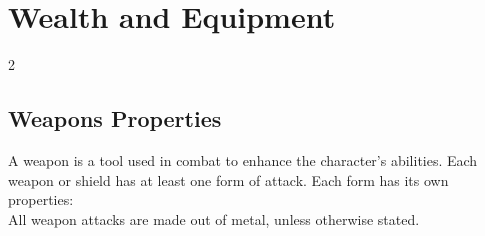\chapter{Wealth and Equipment}

\begin{multicols}{2}

\section{Weapons Properties}

A weapon is a tool used in combat to enhance the character's abilities. Each weapon or shield has at least one form of attack. Each form has its own properties: \\

All weapon attacks are made out of metal, unless otherwise stated.


\end{multicols}
